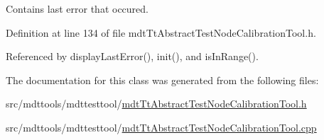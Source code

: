 Contains last error that occured. 



Definition at line 134 of file mdt\-Tt\-Abstract\-Test\-Node\-Calibration\-Tool.\-h.



Referenced by display\-Last\-Error(), init(), and is\-In\-Range().



The documentation for this class was generated from the following files\-:\begin{DoxyCompactItemize}
\item 
src/mdttools/mdttesttool/\hyperlink{mdt_tt_abstract_test_node_calibration_tool_8h}{mdt\-Tt\-Abstract\-Test\-Node\-Calibration\-Tool.\-h}\item 
src/mdttools/mdttesttool/\hyperlink{mdt_tt_abstract_test_node_calibration_tool_8cpp}{mdt\-Tt\-Abstract\-Test\-Node\-Calibration\-Tool.\-cpp}\end{DoxyCompactItemize}
